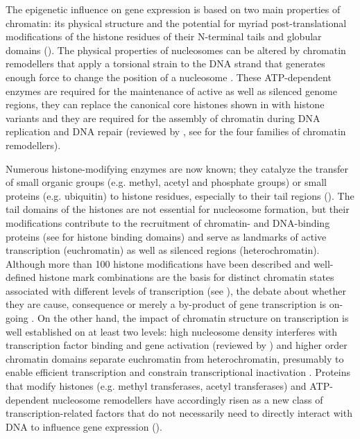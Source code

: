
%
The epigenetic influence on gene expression is based on two main properties of chromatin: its physical structure and the potential for myriad post-translational modifications of the histone residues of their N-terminal tails and globular domains (). The physical properties of nucleosomes can be altered by chromatin remodellers that apply a torsional strain to the DNA strand that generates enough force to change the position of a nucleosome \citep{Manelyte2013}. These ATP-dependent enzymes are required for the maintenance of active as well as silenced genome regions, they can replace the canonical core histones shown in  with histone variants and they are required for the assembly of chromatin during DNA replication and DNA repair (reviewed by \citet{Manelyte2013}, see  for the four families of chromatin remodellers).

Numerous histone-modifying enzymes are now known; they catalyze the transfer of small organic groups (e.g. methyl, acetyl and phosphate groups) or small proteins (e.g. ubiquitin) to histone residues, especially to their tail regions (). The tail domains of the histones are not essential for nucleosome formation, but their modifications contribute to the recruitment of chromatin- and DNA-binding proteins \citep{Turner2014} (see  for histone binding domains) and serve as landmarks of active transcription (euchromatin) as well as silenced regions (heterochromatin). Although more than 100 histone modifications have been described \citep{Kouzarides2007, Tan2011} and well-defined histone mark combinations are the basis for distinct chromatin states associated with different levels of transcription \citep{Ernst2010,Kharchenko2011}  (see ), the debate about whether they are cause, consequence or merely a by-product of gene transcription is on-going \citep{Henikoff2011, Ptashne2013, Whitehouse2013}. On the other hand, the impact of chromatin structure on transcription is well established on at least two levels: high nucleosome density interferes with transcription factor binding and gene activation (reviewed by \citet{Henikoff2011}) and higher order chromatin domains separate euchromatin from heterochromatin, presumably to enable efficient transcription and constrain transcriptional inactivation \citep{Dixon2012}. Proteins that modify histones (e.g. methyl transferases, acetyl transferases) and ATP-dependent nucleosome remodellers have accordingly risen as a new class of transcription-related factors that do not necessarily need to directly interact with DNA to influence gene expression ().\\

